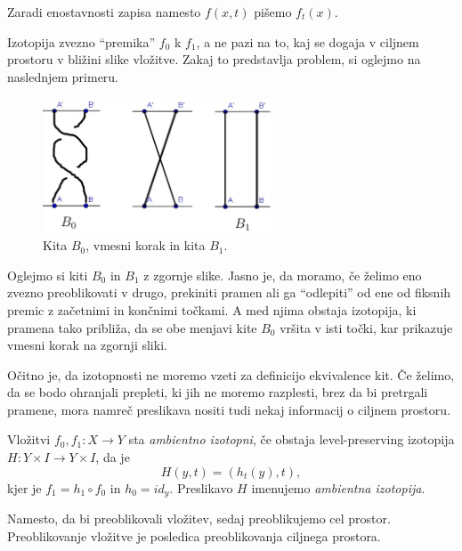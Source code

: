 \documentclass[mat1]{fmfdelo}
\begin{document}
\begin{opomba}
Zaradi enostavnosti zapisa namesto $f(x,t)$ pišemo $f_t(x)$.
\end{opomba}

Izotopija zvezno ``premika'' $f_0$ k $f_1$, a ne pazi na to, kaj se dogaja v ciljnem prostoru v bližini slike vložitve. Zakaj to predstavlja problem, si oglejmo na naslednjem primeru.

\begin{figure}[h!]
\includegraphics[height = 4cm]{Primer_2}
\caption{Kita $B_0$, vmesni korak in kita $B_1$.}
\end{figure}

\begin{primer}
Oglejmo si kiti $B_0$ in $B_1$ z zgornje slike. Jasno je, da moramo, če želimo eno zvezno preoblikovati v drugo, prekiniti pramen ali ga ``odlepiti'' od ene od fiksnih premic z začetnimi in končnimi točkami. A med njima obstaja izotopija, ki pramena tako približa, da se obe menjavi kite $B_0$ vršita v isti točki, kar prikazuje vmesni korak na zgornji sliki.
\end{primer}

Očitno je, da izotopnosti ne moremo vzeti za definicijo ekvivalence kit. Če želimo, da se bodo ohranjali prepleti, ki jih ne moremo razplesti, brez da bi pretrgali pramene, mora namreč preslikava nositi tudi nekaj informacij o ciljnem prostoru.

\begin{definicija}
Vložitvi $f_0,f_1: X \rightarrow Y$ sta \emph{ambientno izotopni}, če obstaja level-preserving izotopija $H: Y \times I \rightarrow Y\times I$, da je
$$H(y,t)=(h_t(y),t),$$ kjer je $f_1=h_1 \circ f_0$ in $h_0=id_y$. Preslikavo $H$ imenujemo \emph{ambientna izotopija}.
\end{definicija}

\begin{opomba}
Namesto, da bi preoblikovali vložitev, sedaj preoblikujemo cel prostor. Preoblikovanje vložitve je posledica preoblikovanja ciljnega prostora.
\end{opomba}
\end{document}

